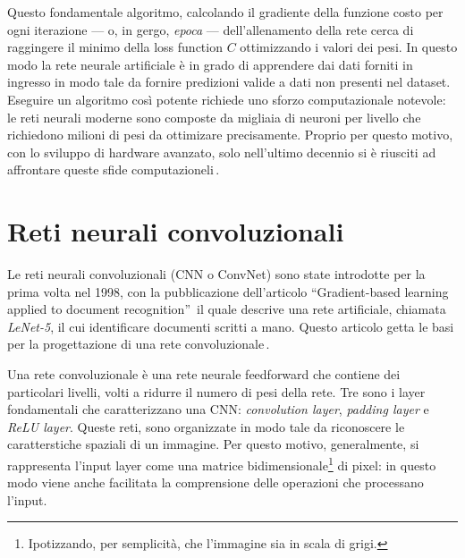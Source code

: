 \noindent Questo fondamentale algoritmo, calcolando il gradiente della funzione costo per ogni iterazione — o, in gergo, \textsl{epoca} — dell'allenamento della rete cerca di raggingere il minimo della loss function $C$ ottimizzando i valori dei pesi. In questo modo la rete neurale artificiale è in grado di apprendere dai dati forniti in ingresso in modo tale da fornire predizioni valide a dati non presenti nel dataset. Eseguire un algoritmo così potente richiede uno sforzo computazionale notevole: le reti neurali moderne sono composte da migliaia di neuroni per livello che richiedono milioni di pesi da ottimizare precisamente. Proprio per questo motivo, con lo sviluppo di hardware avanzato, solo nell'ultimo decennio si è riusciti ad affrontare queste sfide computazioneli\,\cite{flasinski2016introduction, rojas1996backpropagation, nielsen2015neural}.


\section{Reti neurali convoluzionali}
% 
Le reti neurali convoluzionali (\acs{CNN} o \acs{ConvNet}) sono state introdotte per la prima volta nel 1998, con la pubblicazione dell'articolo ``Gradient-based learning applied to document recognition''\,\cite{lecun1998gradient} il quale descrive una rete artificiale, chiamata \textit{LeNet-5}, il cui identificare documenti scritti a mano. Questo articolo getta le basi per la progettazione di una rete convoluzionale\,\cite{aggarwal2018neural}.

Una rete convoluzionale è una rete neurale feedforward che contiene dei particolari livelli, volti a ridurre il numero di pesi della rete. Tre sono i layer fondamentali che caratterizzano una \acs{CNN}: \textit{convolution layer}, \textit{padding layer} e \textit{\acs{ReLU} layer}. Queste reti, sono organizzate in modo tale da riconoscere le caratterstiche spaziali di un immagine. Per questo motivo, generalmente, si rappresenta l'input layer come una matrice bidimensionale\footnote{Ipotizzando, per semplicità, che l'immagine sia in scala di grigi.} di pixel: in questo modo viene anche facilitata la comprensione delle operazioni che processano l'input.

